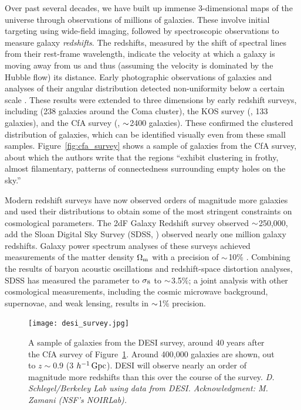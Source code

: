 Over past several decades, we have built up immense 3-dimensional maps of the universe through observations of millions of galaxies.
These involve initial targeting using wide-field imaging, followed by spectroscopic observations to measure galaxy \emph{redshifts}.
The redshifts, measured by the shift of spectral lines from their rest-frame wavelength, indicate the velocity at which a galaxy is moving away from us and thus (assuming the velocity is dominated by the Hubble flow) its distance.
Early photographic observations of galaxies and  analyses of their angular distribution detected non-uniformity below a certain scale \citep{shapley_survey_1932,hubble_distribution_1934,seldner_new_1977,peebles_galaxy_2001}.
These results were extended to three dimensions by early redshift surveys, including \cite{gregory_comaa1367_1978} (238 galaxies around the Coma cluster), the KOS survey (\citealt{kirshner_million_1981}, 133 galaxies), and the CfA survey (\citealt{davis_survey_1982}, $\mathord{\sim}$2400 galaxies).
These confirmed the clustered distribution of galaxies, which can be identified visually even from these small samples. 
Figure~\ref{fig:cfa_survey} shows a sample of galaxies from the CfA survey, about which the authors write that the regions ``exhibit clustering in frothy, almost filamentary, patterns of connectedness surrounding empty holes on the sky.''

Modern redshift surveys have now observed orders of magnitude more galaxies and used their distributions to obtain some of the most stringent constraints on cosmological parameters.
The 2dF Galaxy Redshift survey \citep{Colless2001} observed $\mathord{\sim}$250,000, add the Sloan Digital Sky Survey (SDSS, \citealt{York2000}) observed nearly one million galaxy redshifts.
Galaxy power spectrum analyses of these surveys achieved measurements of the matter density ${\Omega_\mathrm{m}}$ with a precision of $\mathord{\sim}$10\% \citep{cole_2df_2005, tegmark_cosmological_2006}.
Combining the results of baryon acoustic oscillations and redshift-space distortion analyses, SDSS has measured the parameter to $\sigma_\mathrm{8}$ to $\mathord{\sim}$3.5\%; a joint analysis with other cosmological measurements, including the cosmic microwave background, supernovae, and weak lensing, results in $\mathord{\sim}$1\% precision.

\begin{figure}
    \centering
    \texttt{[image: desi\_survey.jpg]}
    \caption{A sample of galaxies from the DESI survey, around 40 years after the CfA survey of Figure~\ref{fig:desi_survey}. Around 400,000 galaxies are shown, out to $z \sim 0.9$ (3 $h^{-1}\,\mathrm{Gpc}$). DESI will observe nearly an order of magnitude more redshifts than this over the course of the survey. \emph{D. Schlegel/Berkeley Lab using data from DESI. Acknowledgment: M. Zamani (NSF's NOIRLab).}}
    \label{fig:desi_survey}
\end{figure}

